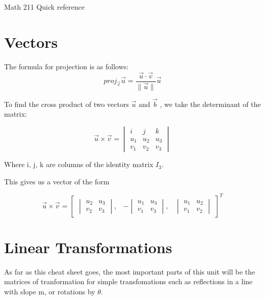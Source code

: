 \documentclass{article}
\begin{document}
\Huge 

Math 211 Quick reference

\normalsize

\section{Vectors}

\begin{df}
The formula for projection is as follows:
\[proj_{\overrightarrow{v}} \overrightarrow{u} = \frac{\overrightarrow{u}\cdot\overrightarrow{v}}
{\|\overrightarrow{u}\|}\overrightarrow{u}\]
\end{df}

\begin{df}
To find the cross product of two vectors $\overrightarrow{u}$ and $\overrightarrow{b}$
, we take the determinant of the matrix: 

\[
\overrightarrow{u} \times \overrightarrow{v}=   
\begin{vmatrix}
i & j & k \\
u_1 & u_2 & u_3 \\
v_1 & v_2 & v_3
\end{vmatrix}\]
\par Where i, j, k are columns of the identity matrix $I_3$.

This gives us a vector of the form

\[ 
\overrightarrow{u} \times \overrightarrow{v}=   
\begin{bmatrix}    
\begin{vmatrix}
    u_2 & u_3\\
    v_2 & v_3
\end{vmatrix}, & 
-\begin{vmatrix}
    u_1 & u_3\\
    v_1 & v_3
\end{vmatrix}, &
\begin{vmatrix}
    u_1 & u_2\\
    v_1 & v_2
\end{vmatrix}
\end{bmatrix}   ^T 
\]
\end{df}

\section{Linear Transformations}
As far as this cheat sheet goes, the most important parts of this unit
will be the matrices of tranformation for simple transfomations such as 
reflections in a line with slope m, or rotations by $\theta$.
\end{document}

